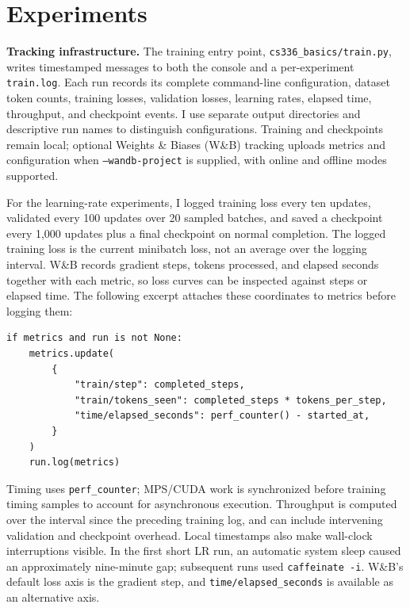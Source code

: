\section{Experiments}



\textbf{Tracking infrastructure.}
The training entry point, \texttt{cs336\_basics/train.py}, writes timestamped
messages to both the console and a per-experiment \texttt{train.log}.
Each run records its complete command-line configuration, dataset token counts,
training losses, validation losses, learning rates, elapsed time, throughput,
and checkpoint events. I use separate output directories and descriptive run
names to distinguish configurations. Training and checkpoints remain local;
optional Weights \& Biases (W\&B) tracking uploads metrics and configuration
when \texttt{--wandb-project} is supplied, with online and offline modes supported.

For the learning-rate experiments, I logged training loss every ten updates,
validated every 100 updates over 20 sampled batches, and saved a checkpoint
every 1,000 updates plus a final checkpoint on normal completion.
The logged training loss is the current minibatch loss, not an average over
the logging interval. W\&B records gradient steps, tokens processed, and elapsed
seconds together with each metric, so loss curves can be inspected against
steps or elapsed time. The following excerpt attaches these coordinates to
metrics before logging them:

\begin{lstlisting}[caption={Step, token, and elapsed-time coordinates for experiment metrics.}]
if metrics and run is not None:
    metrics.update(
        {
            "train/step": completed_steps,
            "train/tokens_seen": completed_steps * tokens_per_step,
            "time/elapsed_seconds": perf_counter() - started_at,
        }
    )
    run.log(metrics)
\end{lstlisting}

Timing uses \texttt{perf\_counter}; MPS/CUDA work is synchronized before
training timing samples to account for asynchronous execution. Throughput is
computed over the interval since the preceding training log, and can include
intervening validation and checkpoint overhead. Local timestamps also make
wall-clock interruptions visible. In the first short LR run, an automatic
system sleep caused an approximately nine-minute gap; subsequent runs used
\texttt{caffeinate -i}. W\&B's default loss axis is the gradient step, and
\texttt{time/elapsed\_seconds} is available as an alternative axis.

